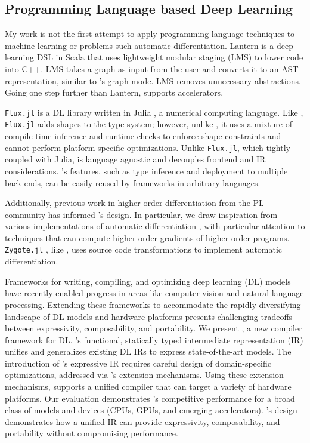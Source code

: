 \subsection{Programming Language based Deep Learning}

My work is not the first attempt to apply programming language
    techniques to machine learning or problems such automatic differentiation.
Lantern \citep{lantern} is a deep learning DSL in Scala
    that uses lightweight modular staging (LMS) to lower code into C++.
LMS takes a graph as input from the user and converts it to an AST
    representation, similar to \relay's graph mode.
LMS removes unnecessary abstractions.
Going one step further than Lantern,
    \relay supports accelerators.

\verb|Flux.jl| \citep{fluxjl} is a DL library written in Julia \citep{julia}, a numerical
computing language. Like \relay, \verb|Flux.jl| adds shapes to the type system; however, unlike \relay, it
uses a mixture of compile-time inference and runtime checks to enforce shape constraints
\citep{jlmlpl} and cannot perform platform-specific optimizations. Unlike \verb|Flux.jl|, which
tightly coupled with Julia, \relay is language agnostic and decouples frontend and IR
considerations.
\relay's features, such as type inference and deployment to multiple back-ends, can
    be easily reused by frameworks in arbitrary languages.

Additionally, previous work in higher-order differentiation from the PL community
has informed \relay's design.
In particular, we draw inspiration from various implementations of
automatic differentiation \citep{beautiful_diff, ad_survey, haskell_ad, toplas_reverse, wang_reverse, DLS, DDF},
with particular attention to techniques that can compute higher-order gradients of higher-order programs.
\verb|Zygote.jl| \citep{zygotejl}, like \relay, uses source code transformations to
    implement automatic differentiation.


Frameworks for writing, compiling, and optimizing
  deep learning (DL) models have recently
  enabled progress in areas like computer
  vision and natural language processing.
Extending these frameworks to accommodate
  the rapidly diversifying landscape of
  DL models and hardware platforms presents
  challenging tradeoffs between
  expressivity, composability, and portability.
We present \relay,
  a new compiler framework for DL.
\relay's functional, statically typed intermediate representation (IR)
  unifies and generalizes existing DL IRs
  to express state-of-the-art models.
The introduction of \relay's expressive IR requires
  careful design of domain-specific optimizations,
  addressed via \relay's extension mechanisms.
Using these extension mechanisms,
  \relay supports a unified compiler that
  can target a variety of hardware platforms.
Our evaluation demonstrates \relay's competitive performance for a
  broad class of models and devices
  (CPUs, GPUs, and emerging accelerators).
\relay's design demonstrates how a unified IR can provide
  expressivity, composability, and portability
  without compromising performance.


